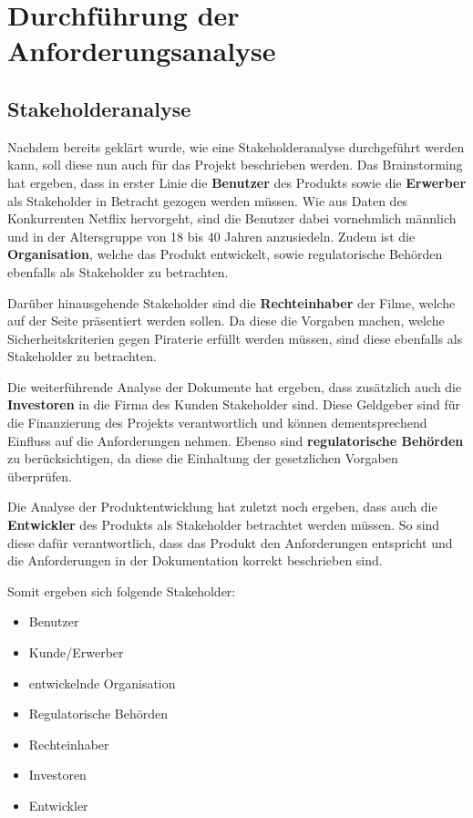 \section{Durchführung der Anforderungsanalyse}
\subsection{Stakeholderanalyse}
Nachdem bereits geklärt wurde, wie eine Stakeholderanalyse durchgeführt werden kann, soll diese nun auch für das Projekt beschrieben werden.
Das Brainstorming hat ergeben, dass in erster Linie die \textbf{Benutzer} des Produkts sowie die \textbf{Erwerber} als Stakeholder in Betracht gezogen werden müssen.
Wie aus Daten des Konkurrenten Netflix hervorgeht, sind die Benutzer dabei vornehmlich männlich\autocite[vgl.][]{Ailon.a} und in der Altersgruppe von 18 bis 40 Jahren anzusiedeln\autocite[vgl.][]{Ailon.b}.
Zudem ist die \textbf{Organisation}, welche das Produkt entwickelt, sowie regulatorische Behörden ebenfalls als Stakeholder zu betrachten.

Darüber hinausgehende Stakeholder sind die \textbf{Rechteinhaber} der Filme, welche auf der Seite präsentiert werden sollen.
Da diese die Vorgaben machen, welche Sicherheitskriterien gegen Piraterie erfüllt werden müssen, sind diese ebenfalls als Stakeholder zu betrachten.

Die weiterführende Analyse der Dokumente hat ergeben, dass zusätzlich auch die \textbf{Investoren} in die Firma des Kunden Stakeholder sind.
Diese Geldgeber sind für die Finanzierung des Projekts verantwortlich und können dementsprechend Einfluss auf die Anforderungen nehmen.
Ebenso sind \textbf{regulatorische Behörden} zu berücksichtigen, da diese die Einhaltung der gesetzlichen Vorgaben überprüfen.

Die Analyse der Produktentwicklung hat zuletzt noch ergeben, dass auch die \textbf{Entwickler} des Produkts als Stakeholder betrachtet werden müssen.
So sind diese dafür verantwortlich, dass das Produkt den Anforderungen entspricht und die Anforderungen in der Dokumentation korrekt beschrieben sind.

Somit ergeben sich folgende Stakeholder:
\begin{itemize}
    \item Benutzer
    \item Kunde/Erwerber
    \item entwickelnde Organisation
    \item Regulatorische Behörden
    \item Rechteinhaber
    \item Investoren
    \item Entwickler
\end{itemize}

